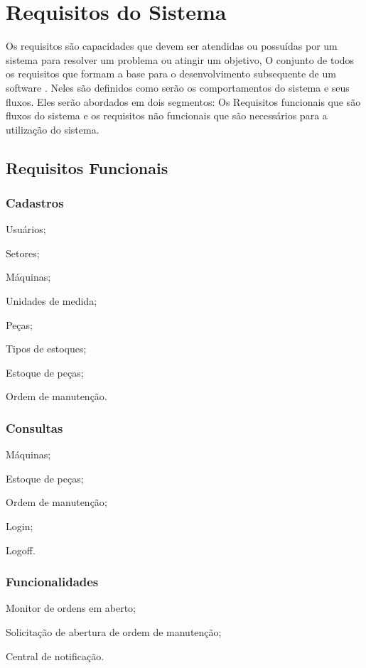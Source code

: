 \chapter{Requisitos do Sistema}
Os requisitos são capacidades que devem ser atendidas ou possuídas por um sistema para resolver um problema ou atingir um objetivo, O conjunto de todos os requisitos que formam a base para o desenvolvimento subsequente de um software \cite{vazquez2016}. Neles são definidos como serão os comportamentos do sistema e seus fluxos. Eles serão abordados em dois segmentos: Os Requisitos funcionais que são fluxos do sistema e os requisitos não funcionais que são necessários para a utilização do sistema.

\section{Requisitos Funcionais}

\subsection{Cadastros}


\begin{subalineas}
	\item {Usuários};
	\item {Setores};
	\item {Máquinas};
	\item {Unidades de medida};
	\item {Peças};
	\item {Tipos de estoques};
	\item {Estoque de peças};
	\item {Ordem de manutenção}.
\end{subalineas}

\subsection{Consultas}
\begin{subalineas}
	\item {Máquinas};
	\item {Estoque de peças};
	\item {Ordem de manutenção};
	\item {Login};
	\item {Logoff}.
\end{subalineas}

\subsection{Funcionalidades}
\begin{subalineas}
	\item {Monitor de ordens em aberto};
	\item {Solicitação de abertura de ordem de manutenção};
	\item {Central de notificação}.
\end{subalineas}

